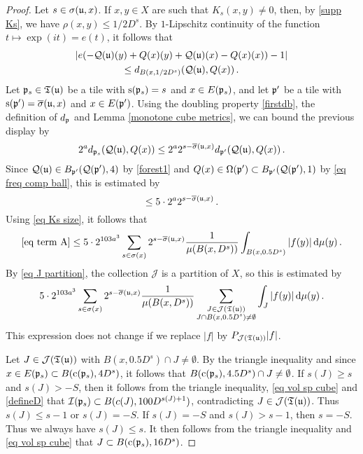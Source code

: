 {\begin{proof}
    Let $s \in \sigma(\mathfrak u,x)$.
    If $x, y \in X$ are such that $K_s(x,y)\neq 0$, then, by \eqref{supp Ks}, we have $\rho(x,y)\leq 1/2 D^s$. By $1$-Lipschitz continuity of the function $t \mapsto \exp(it) = e(t)$, it follows that
    \begin{multline*}
        |e(-\mathcal{Q}(\mathfrak u)(y)+{Q}(x)(y)+\mathcal{Q}(\mathfrak u)(x)-{Q}(x)(x))-1|\\
        \leq d_{B(x, 1/2 D^{s})}(\mathcal{Q}(\mathfrak u), {Q}(x))\,.
    \end{multline*}
    Let $\mathfrak p_s \in \mathfrak T(\mathfrak u)$ be a tile with $\mathrm{s}(\mathfrak p_s) = s$ and $x \in E(\mathfrak p_s)$, and let $\mathfrak p'$ be a tile with $\mathrm{s}(\mathfrak p') = \overline{\sigma}(\mathfrak u, x)$ and $x \in E(\mathfrak p')$.
    Using the doubling property \eqref{firstdb}, the definition of $d_{\mathfrak p}$ and Lemma \ref{monotone cube metrics}, we can bound the previous display by
    $$
        2^a d_{\mathfrak p_s}(\mathcal{Q}(\mathfrak u), {Q}(x)) \le 2^{a} 2^{s - \overline{\sigma}(\mathfrak u, x)} d_{\mathfrak p'}(\mathcal{Q}(\mathfrak u), {Q}(x))\,.
    $$
    Since $\mathcal{Q}(\mathfrak u) \in B_{\mathfrak p'}(\mathcal{Q}(\mathfrak p'), 4)$ by \eqref{forest1} and ${Q}(x) \in \Omega(\mathfrak p') \subset B_{\mathfrak p'}(\mathcal{Q}(\mathfrak p'), 1)$ by \eqref{eq freq comp ball}, this is estimated by
    $$
        \le 5 \cdot 2^{a} 2^{s - \overline{\sigma}(\mathfrak u, x)} \,.
    $$
    Using \eqref{eq Ks size}, it follows that
    $$
        \eqref{eq term A} \le 5\cdot 2^{103a^3} \sum_{s\in\sigma(x)}2^{s - \overline{\sigma}(\mathfrak u, x)} \frac{1}{\mu(B(x,D^s))}\int_{B(x,0.5D^{s})}|f(y)|\,\mathrm{d}\mu(y)\,.
    $$
    By \eqref{eq J partition}, the collection $\mathcal{J}$ is a partition of $X$, so this is estimated by
    $$
         5\cdot 2^{103a^3} \sum_{s\in\sigma(x)}2^{s - \overline{\sigma}(\mathfrak u, x)} \frac{1}{\mu(B(x,D^s))}\sum_{\substack{J \in \mathcal{J}(\mathfrak T(\mathfrak u))\\J \cap B(x, 0.5D^s) \ne \emptyset} }\int_{J}|f(y)|\,\mathrm{d}\mu(y)\,.
    $$
    This expression does not change if we replace $|f|$ by $P_{\mathcal{J}(\mathfrak T(\mathfrak u))}|f|$.

    Let $J \in \mathcal{J}(\mathfrak T(\mathfrak u))$ with $B(x, 0.5 D^s) \cap J \ne \emptyset$. By the triangle inequality and since $x \in E(\mathfrak p_s) \subset B(\mathrm{c}(\mathfrak p_s), 4D^{s})$, it follows that $B(\mathrm{c}(\mathfrak p_s), 4.5D^s) \cap J \ne \emptyset$. If $s(J) \ge s$ and $s(J) > -S$, then it follows from the triangle inequality, \eqref{eq vol sp cube} and \eqref{defineD} that $\mathcal{I}(\mathfrak p_s) \subset B(c(J), 100 D^{s(J)+1})$, contradicting $J \in \mathcal{J}(\mathfrak{T}(\mathfrak u))$. Thus $s(J) \le s - 1$ or $s(J) = -S$. If $s(J) = -S$ and $s(J) > s - 1$, then $s = -S$. Thus we always have $s(J) \le s$. It then follows from the triangle inequality and \eqref{eq vol sp cube} that $J \subset B(\mathrm{c}(\mathfrak p_s), 16 D^s)$.


\end{proof}}
